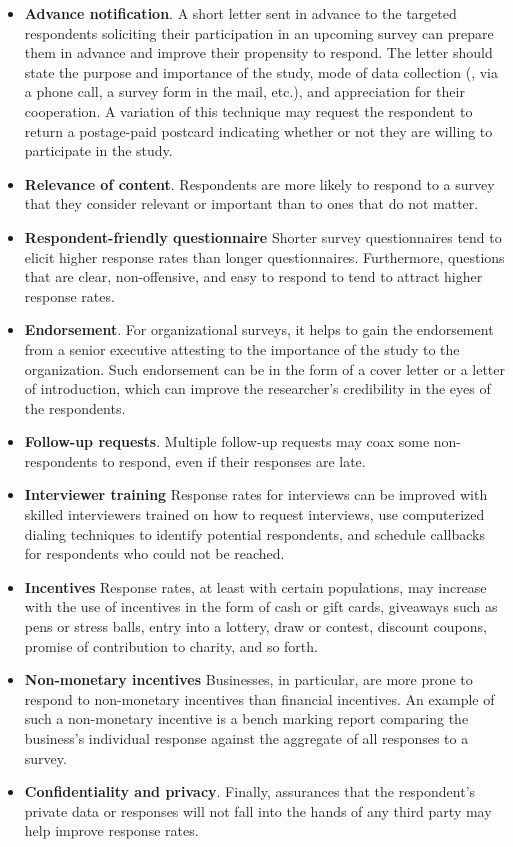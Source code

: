 \begin{description}
\begin{itemize}
	\item \textbf{Advance notification}. A short letter sent in advance to the targeted respondents soliciting their participation in an upcoming survey can prepare them in advance and improve their propensity to respond. The letter should state the purpose and importance of the study, mode of data collection (\eg, via a phone call, a survey form in the mail, etc.), and appreciation for their cooperation. A variation of this technique may request the respondent to return a postage-paid postcard indicating whether or not they are willing to participate in the study.
	\item \textbf{Relevance of content}. Respondents are more likely to respond to a survey that they consider relevant or important than to ones that do not matter.
	\item \textbf{Respondent-friendly questionnaire} Shorter survey questionnaires tend to elicit higher response rates than longer questionnaires. Furthermore, questions that are clear, non-offensive, and easy to respond to tend to attract higher response rates.
	\item \textbf{Endorsement}. For organizational surveys, it helps to gain the endorsement from a senior executive attesting to the importance of the study to the organization. Such endorsement can be in the form of a cover letter or a letter of introduction, which can improve the researcher's credibility in the eyes of the respondents.
	\item \textbf{Follow-up requests}. Multiple follow-up requests may coax some non-respondents to respond, even if their responses are late.
	\item \textbf{Interviewer training} Response rates for interviews can be improved with skilled interviewers trained on how to request interviews, use computerized dialing techniques to identify potential respondents, and schedule callbacks for respondents who could not be reached.
	\item \textbf{Incentives} Response rates, at least with certain populations, may increase with the use of incentives in the form of cash or gift cards, giveaways such as pens or stress balls, entry into a lottery, draw or contest, discount coupons, promise of contribution to charity, and so forth.
	\item \textbf{Non-monetary incentives} Businesses, in particular, are more prone to respond to non-monetary incentives than financial incentives. An example of such a non-monetary incentive is a bench marking report comparing the business's individual response against the aggregate of all responses to a survey.
	\item \textbf{Confidentiality and privacy}. Finally, assurances that the respondent's private data or responses will not fall into the hands of any third party may help improve response rates.
\end{itemize}


\end{description}
